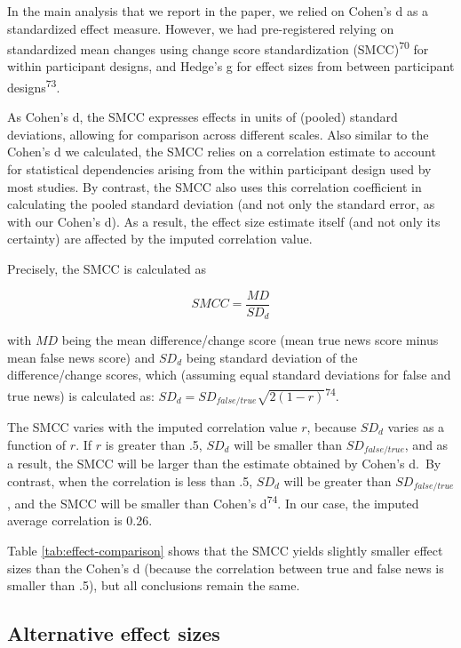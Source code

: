 \documentclass[
  doc,floatsintext]{apa6}
\begin{document}
In the main analysis that we report in the paper, we relied on Cohen's d as a standardized effect measure. However, we had pre-registered relying on standardized mean changes using change score standardization (SMCC)\textsuperscript{70} for within participant designs, and Hedge's g for effect sizes from between participant designs\textsuperscript{73}.

As Cohen's d, the SMCC expresses effects in units of (pooled) standard deviations, allowing for comparison across different scales. Also similar to the Cohen's d we calculated, the SMCC relies on a correlation estimate to account for statistical dependencies arising from the within participant design used by most studies. By contrast, the SMCC also uses this correlation coefficient in calculating the pooled standard deviation (and not only the standard error, as with our Cohen's d). As a result, the effect size estimate itself (and not only its certainty) are affected by the imputed correlation value.

Precisely, the SMCC is calculated as

\[
SMCC = \frac{MD}{SD_d}
\]

with \(MD\) being the mean difference/change score (mean true news score minus mean false news score) and \(SD_d\) being standard deviation of the difference/change scores, which (assuming equal standard deviations for false and true news) is calculated as: \(SD_d = SD_{false/true}\sqrt{2(1-r)}\)\textsuperscript{74}.

The SMCC varies with the imputed correlation value \(r\), because \(SD_d\) varies as a function of \(r\). If \(r\) is greater than .5, \(SD_d\) will be smaller than \(SD_{false/true}\), and as a result, the SMCC will be larger than the estimate obtained by Cohen's d.~By contrast, when the correlation is less than .5, \(SD_d\) will be greater than \(SD_{false/true}\), and the SMCC will be smaller than Cohen's d\textsuperscript{74}. In our case, the imputed average correlation is 0.26.

Table \ref{tab:effect-comparison} shows that the SMCC yields slightly smaller effect sizes than the Cohen's d (because the correlation between true and false news is smaller than .5), but all conclusions remain the same.

\subsection{Alternative effect sizes}\label{alternative-effect-sizes}
\end{document}
